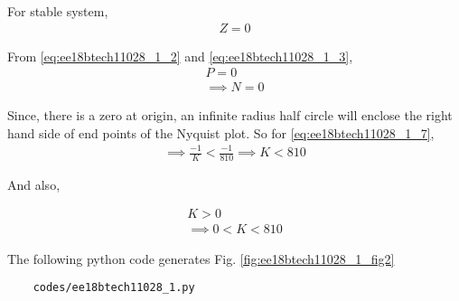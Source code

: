 For stable system, 
\begin{align}
    Z = 0
\end{align}

From \eqref{eq:ee18btech11028_1_2} and \eqref{eq:ee18btech11028_1_3},
\begin{align}
    P = 0
\\
    \implies N = 0
    \label{eq:ee18btech11028_1_7}
\end{align}




Since, there is a zero at origin, an infinite radius half circle will enclose the right hand side of end points of the Nyquist plot.
So for \eqref{eq:ee18btech11028_1_7},
\begin{align}
    \implies \frac{-1}{K} < \frac{-1}{810}
    \implies K < 810
\end{align}

And also,

\begin{align}
    K > 0
\\
    \implies 0 < K < 810     
\end{align}


The following python code generates  Fig. \ref{fig:ee18btech11028_1_fig2}
\begin{lstlisting}
    codes/ee18btech11028_1.py
\end{lstlisting}
